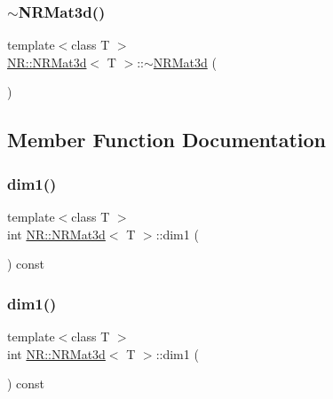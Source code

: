 \mbox{\label{classNR_1_1NRMat3d_a6c8dc36e24e162855f99ccfbc380ff52}} 
\subsubsection{\texorpdfstring{$\sim$NRMat3d()}{~NRMat3d()}\hspace{0.1cm}{\footnotesize\ttfamily [2/2]}}
{\footnotesize\ttfamily template$<$class T $>$ \\
\mbox{\hyperlink{classNR_1_1NRMat3d}{N\+R\+::\+N\+R\+Mat3d}}$<$ T $>$\+::$\sim$\mbox{\hyperlink{classNR_1_1NRMat3d}{N\+R\+Mat3d}} (\begin{DoxyParamCaption}{ }\end{DoxyParamCaption})}



\subsection{Member Function Documentation}
\mbox{\label{classNR_1_1NRMat3d_ae46651c069e6954e03e5d3a39ffd2891}} 
\subsubsection{\texorpdfstring{dim1()}{dim1()}\hspace{0.1cm}{\footnotesize\ttfamily [1/2]}}
{\footnotesize\ttfamily template$<$class T $>$ \\
int \mbox{\hyperlink{classNR_1_1NRMat3d}{N\+R\+::\+N\+R\+Mat3d}}$<$ T $>$\+::dim1 (\begin{DoxyParamCaption}{ }\end{DoxyParamCaption}) const\hspace{0.3cm}{\ttfamily [inline]}}

\mbox{\label{classNR_1_1NRMat3d_ae46651c069e6954e03e5d3a39ffd2891}} 
\subsubsection{\texorpdfstring{dim1()}{dim1()}\hspace{0.1cm}{\footnotesize\ttfamily [2/2]}}
{\footnotesize\ttfamily template$<$class T $>$ \\
int \mbox{\hyperlink{classNR_1_1NRMat3d}{N\+R\+::\+N\+R\+Mat3d}}$<$ T $>$\+::dim1 (\begin{DoxyParamCaption}{ }\end{DoxyParamCaption}) const\hspace{0.3cm}{\ttfamily [inline]}}

